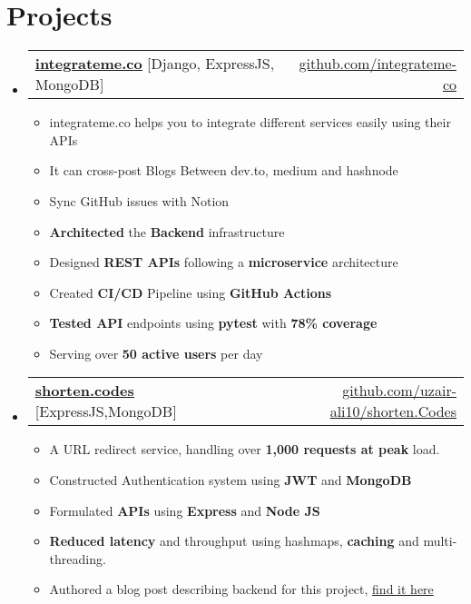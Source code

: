 \documentclass[letterpaper,11pt]{article}
\makeatletter
\newcommand{\resumeItem}[1]{
  \item\small{
    {#1 \vspace{-2pt}}
  }
}
\newcommand{\resumeProjectHeading}[2]{
    \item
    \begin{tabular*}{0.97\textwidth}{l@{\extracolsep{\fill}}r}
      \small#1 & #2 \\
    \end{tabular*}\vspace{-7pt}
}
\newcommand{\resumeSubHeadingListStart}{\begin{itemize}[leftmargin=0.15in, label={}]}
\newcommand{\resumeSubHeadingListEnd}{\end{itemize}}
\newcommand{\resumeItemListStart}{\begin{itemize}}
\newcommand{\resumeItemListEnd}{\end{itemize}\vspace{-5pt}}
\makeatother
\begin{document}
\section{Projects}
    \resumeSubHeadingListStart
      \resumeProjectHeading
          {\textbf{\href{https://integrateme.co/}{\underline{integrateme.co}}}{  [Django, ExpressJS, MongoDB]}}{\href{https://github.com/integrateme-co/}{github.com/integrateme-co}}
          \resumeItemListStart
           \resumeItem{integrateme.co helps you to integrate different services easily using their APIs}
           \resumeItem{It can cross-post Blogs Between dev.to, medium and hashnode}
           \resumeItem{Sync GitHub issues with Notion}
           \resumeItem{\textbf{Architected} the \textbf{Backend} infrastructure}
           \resumeItem{Designed \textbf{REST APIs} following a \textbf{microservice} architecture}
           \resumeItem{Created \textbf{CI/CD} Pipeline using \textbf{GitHub Actions}}
           \resumeItem{\textbf{Tested API} endpoints using \textbf{pytest} with \textbf{78\% coverage}}
           \resumeItem{Serving over \textbf{50 active users} per day}
          \resumeItemListEnd
    \resumeSubHeadingListEnd
    
\resumeSubHeadingListStart
      \resumeProjectHeading
       {\textbf{\href{https://shorten.codes/}{\underline{shorten.codes}}}{          [ExpressJS,MongoDB]}}{\href{https://github.com/uzair-ali10/shorten.Codes/}{github.com/uzair-ali10/shorten.Codes}}
          \resumeItemListStart
           \resumeItem{A URL redirect service, handling over \textbf{1,000 requests at peak} load.}
           \resumeItem{Constructed Authentication system using \textbf{JWT} and \textbf{MongoDB}}
           \resumeItem{Formulated \textbf{APIs} using \textbf{Express} and \textbf{Node JS}}
           \resumeItem{\textbf{Reduced latency}  and throughput using hashmaps, \textbf{caching} and multi-threading.}
           \resumeItem{Authored a blog post describing backend for this project, \href{https://medium.com/@uzair-ali10/building-backend-of-a-url-shortening-service-part-i-b3b834895900}{find it here}}
          \resumeItemListEnd
    \resumeSubHeadingListEnd
\end{document}
